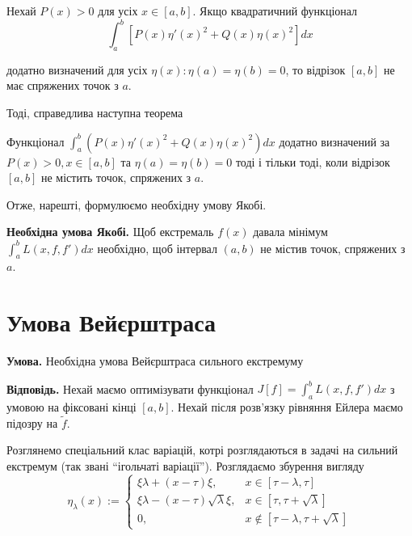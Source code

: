 \documentclass[14pt]{extarticle}
\newcommand{\<}{\langle}
\renewcommand{\>}{\rangle}
\theoremstyle{mystyle}{\newtheorem{definition}{Definition}[section]}
\theoremstyle{mystyle}{\newtheorem{proposition}[definition]{Proposition}}
\theoremstyle{mystyle}{\newtheorem{theorem}[definition]{Theorem}}
\theoremstyle{mystyle}{\newtheorem{lemma}[definition]{Lemma}}
\theoremstyle{mystyle}{\newtheorem{corollary}[definition]{Corollary}}
\theoremstyle{mystyle}{\newtheorem*{remark}{Remark}}
\theoremstyle{mystyle}{\newtheorem*{remarks}{Remarks}}
\theoremstyle{mystyle}{\newtheorem*{example}{Example}}
\theoremstyle{mystyle}{\newtheorem*{examples}{Examples}}
\theoremstyle{definition}{\newtheorem*{exercise}{Exercise}}
\theoremstyle{cstyle}{\newtheorem*{cthm}{}}
\theoremstyle{warn}
\begin{document}
\begin{theorem}
    Нехай $P(x)>0$ для усіх $x \in [a,b]$. Якщо квадратичний функціонал 
    \begin{equation}
        \int_a^b [P(x)\eta'(x)^2+Q(x)\eta(x)^2]dx
    \end{equation}

    додатно визначений для усіх $\eta(x): \eta(a)=\eta(b)=0$, то відрізок $[a,b]$ не має спряжених точок з $a$.
\end{theorem}

Тоді, справедлива наступна теорема
\begin{theorem}
    Функціонал $\int_a^b (P(x)\eta'(x)^2+Q(x)\eta(x)^2)dx$ додатно визначений за $P(x)>0,x \in [a,b]$ та $\eta(a)=\eta(b)=0$ тоді і тільки тоді, коли відрізок $[a,b]$ не містить точок, спряжених з $a$.
\end{theorem}

Отже, нарешті, формулюємо необхідну умову Якобі.

\begin{theorem}
    \textbf{Необхідна умова Якобі.} Щоб екстремаль $f(x)$ давала мінімум $\int_a^b L(x,f,f')dx$ необхідно, щоб інтервал $(a,b)$ не містив точок, спряжених з $a$.
\end{theorem}

\pagebreak

\section{Умова Вейєрштраса}

\textbf{Умова.} Необхідна умова Вейєрштраса сильного екстремуму

\textbf{Відповідь.} Нехай маємо оптимізувати функціонал $J[f]=\int_a^b L(x,f,f')dx$ з умовою на фіксовані кінці $[a,b]$. 
Нехай після розв'язку рівняння Ейлера маємо підозру на $\widetilde{f}$.

Розглянемо спеціальний клас варіацій, котрі розглядаються в задачі на сильний екстремум (так звані ``ігольчаті варіації''). Розглядаємо збурення вигляду
\begin{equation}
    \eta_{\lambda}(x) := \begin{cases}
        \xi\lambda + (x-\tau)\xi, & x \in [\tau-\lambda,\tau] \\
        \xi\lambda - (x-\tau)\sqrt{\lambda}\xi, & x \in [\tau,\tau+\sqrt{\lambda}] \\
        0, & x \not\in [\tau-\lambda,\tau+\sqrt{\lambda}]
    \end{cases}
\end{equation}
\end{document}

